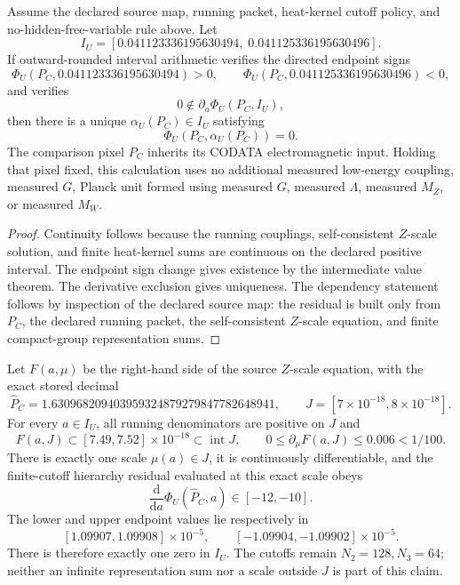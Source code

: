 \begin{theorem}\label{thm:particle-ru-witness}
Assume the declared source map, running packet, heat-kernel cutoff policy, and
no-hidden-free-variable rule above. Let
\[
I_U=[0.041123336195630494,\;0.041125336195630496].
\]
If outward-rounded interval arithmetic verifies the directed endpoint signs
\[
\Phi_U(P_C,0.041123336195630494)>0,
\qquad
\Phi_U(P_C,0.041125336195630496)<0,
\]
and verifies
\[
0\notin \partial_a\Phi_U(P_C,I_U),
\]
then there is a unique \(\alpha_U(P_C)\in I_U\) satisfying
\[
\Phi_U(P_C,\alpha_U(P_C))=0.
\]
The comparison pixel \(P_C\) inherits its CODATA electromagnetic input.
Holding that pixel fixed, this calculation uses no additional measured
low-energy coupling, measured \(G\), Planck unit formed using measured
\(G\), measured \(\Lambda\), measured \(M_Z\), or measured \(M_W\).
\end{theorem}

\begin{proof}
Continuity follows because the running couplings, self-consistent \(Z\)-scale solution, and
finite heat-kernel sums are continuous on the declared positive interval. The endpoint sign
change gives existence by the intermediate value theorem. The derivative exclusion gives
uniqueness. The dependency statement follows by inspection of the declared source map: the residual
is built only from \(P_C\), the declared running packet, the self-consistent \(Z\)-scale equation,
and finite compact-group representation sums.
\end{proof}

\begin{theorem}
\label{thm:particle-implicit-scale-attachment}
Let $F(a,\mu)$ be the right-hand side of the source $Z$-scale equation,
with the exact stored decimal
\[
 \widehat P_C=1.630968209403959324879279847782648941,
 \qquad J=[7\times10^{-18},8\times10^{-18}].
\]
For every $a\in I_U$, all running denominators are positive on $J$ and
\[
 F(a,J)\subset[7.49,7.52]\times10^{-18}\subset\operatorname{int}J,
 \qquad 0\le\partial_\mu F(a,J)\le0.006<1/100.
\]
There is exactly one scale $\mu(a)\in J$, it is continuously differentiable,
and the finite-cutoff hierarchy residual evaluated at this exact scale obeys
\[
 \frac{\mathrm d}{\mathrm da}\Phi_U(\widehat P_C,a)\in[-12,-10].
\]
The lower and upper endpoint values lie respectively in
\[
 [1.09907,1.09908]\times10^{-5},\qquad
 [-1.09904,-1.09902]\times10^{-5}.
\]
There is therefore exactly one zero in $I_U$. The cutoffs remain $N_2=128,N_3=64$; neither an
infinite representation sum nor a scale outside $J$ is part of this claim.
\end{theorem}

